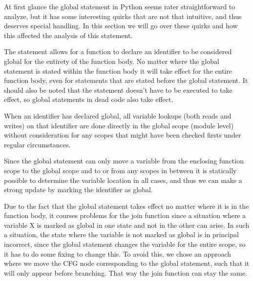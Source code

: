 At first glance the global statement in Python seems rater straightforward to analyze, but it has some interesting quirks that are not that intuitive, 
and thus deserves special handling. In this section we will go over these quirks and how this affected the analysis of this statement.

The statement allows for a function to declare an identifier to be considered global for the entirety of the function body. 
No matter where the global statement is stated within the function body it will take effect for the entire function body, 
even for statements that are stated before the global statement. It should also be noted that the statement doesn't 
have to be executed to take effect, so global statements in dead code also take effect.

When an identifier has declared global, all variable lookups (both reads and writes) on that identifier are done directly in the global scope (module level) 
without consideration for any scopes that might have been checked firsts under regular circumstances.

Since the global statement can only move a variable from the enclosing function scope to the global scope and to or from any scopes in between 
it is statically possible to determine the variable location in all cases, and thus we can make a strong update by marking the identifier as global. 

Due to the fact that the global statement takes effect no matter where it is in the function body, it courses problems for the join function 
since a situation where a variable X is marked as global in one state and not in the other can arise. In such a situation, the state where the variable is not marked as global is in principal incorrect, since the global statement changes the variable for the entire scope, so it has to do some fixing to change this. To avoid this, we chose an approach where we move the CFG node corresponding to the global statement, such that it will only appear before branching. That way the join function can stay the same.

